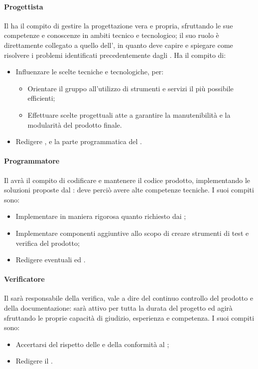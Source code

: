 \paragraph{Progettista}
Il \prog{} ha il compito di gestire la progettazione vera e propria, sfruttando le sue competenze e conoscenze in ambiti tecnico e tecnologico; il suo ruolo è direttamente collegato a quello dell'\ana, in quanto deve capire e spiegare come risolvere i problemi identificati precedentemente dagli \anas. Ha il compito di:
\begin{itemize}
\item Influenzare le scelte tecniche e tecnologiche, per:
\begin{itemize}
\item Orientare il gruppo all'utilizzo di strumenti e servizi il più possibile efficienti;
\item Effettuare scelte progettuali atte a garantire la manutenibilità e la modularità del prodotto finale.
\end{itemize} 
\item Redigere \ST{}, \DdP{} e la parte programmatica del \PdQ{}.
\end{itemize}

\paragraph{Programmatore}
Il \progr{} avrà il compito di codificare e mantenere il codice prodotto, implementando le soluzioni proposte dal \prog{}: deve perciò avere alte competenze tecniche. I suoi compiti sono:
\begin{itemize}
\item Implementare in maniera rigorosa quanto richiesto dai \progs{};
\item Implementare componenti aggiuntive allo scopo di creare strumenti di test e verifica del prodotto;
\item Redigere eventuali \MU{} ed \MM{}.
\end{itemize}

\paragraph{Verificatore}
Il \ver{} sarà responsabile della verifica, vale a dire del continuo controllo del prodotto e della documentazione: sarà attivo per tutta la durata del progetto ed agirà sfruttando le proprie capacità di giudizio, esperienza e competenza. I suoi compiti sono:
\begin{itemize}
\item Accertarsi del rispetto delle \NdP{} e della conformità al \PdQ{};
\item Redigere il \PdQ{}.
\end{itemize}

